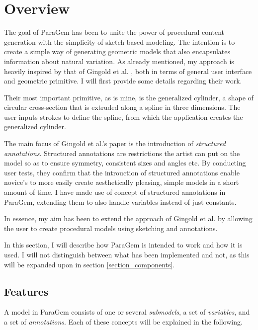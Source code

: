 \documentclass[english]{article}
\begin{document}
\pagebreak

\section{Overview} \label{section_architecture}

The goal of ParaGem has been to unite the power of procedural content generation with the simplicity of sketch-based modeling. The intention is to create a simple way of generating geometric models that also encapsulates information about natural variation. As already mentioned, my approach is heavily inspired by that of Gingold et al. \cite{gingold09}, both in terms of general user interface and geometric primitive. I will first provide some details regarding their work.

Their most important primitive, as is mine, is the generalized cylinder, a shape of circular cross-section that is extruded along a spline in three dimensions. The user inputs strokes to define the spline, from which the application creates the generalized cylinder.

The main focus of Gingold et al.'s paper is the introduction of \textit{structured annotations}. Structured annotations are restrictions the artist can put on the model so as to ensure symmetry, consistent sizes and angles etc. By conducting user tests, they confirm that the introuction of structured annotations enable novice's to more easily create aesthetically pleasing, simple models in a short amount of time. I have made use of concept of structured annotations in ParaGem, extending them to also handle variables instead of just constants.

In essence, my aim has been to extend the approach of Gingold et al. by allowing the user to create procedural models using sketching and annotations.

In this section, I will describe how ParaGem is intended to work and how it is used. I will not distinguish between what has been implemented and not, as this will be expanded upon in section \ref{section_components}.

\subsection{Features}

A model in ParaGem consists of one or several \textit{submodels}, a set of \textit{variables}, and a set of \textit{annotations}. Each of these concepts will be explained in the following.
\end{document}
